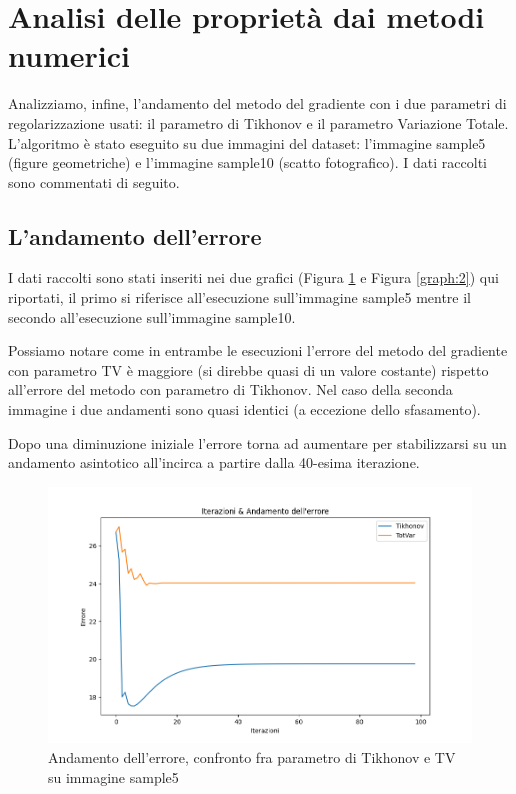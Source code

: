 \documentclass[12pt]{article}
\begin{document}
    \newpage

\section{Analisi delle proprietà dai metodi numerici}
    Analizziamo, infine, l'andamento del metodo del gradiente con i due parametri di regolarizzazione usati: il parametro di Tikhonov e il parametro Variazione Totale. L'algoritmo è stato eseguito su due immagini del dataset: l'immagine sample5 (figure geometriche) e l'immagine sample10 (scatto fotografico).
    I dati raccolti sono commentati di seguito.

    \subsection{L'andamento dell'errore}
    I dati raccolti sono stati inseriti nei due grafici (Figura \ref{graph:1} e Figura \ref{graph:2}) qui riportati, il primo si riferisce all'esecuzione sull'immagine sample5 mentre il secondo all'esecuzione sull'immagine sample10.

    Possiamo notare come in entrambe le esecuzioni l'errore del metodo del gradiente con parametro TV è maggiore (si direbbe quasi di un valore costante) rispetto all'errore del metodo con parametro di Tikhonov. Nel caso della seconda immagine i due andamenti sono quasi identici (a eccezione dello sfasamento).

    Dopo una diminuzione iniziale l'errore torna ad aumentare per stabilizzarsi su un andamento asintotico all'incirca a partire dalla 40-esima iterazione.

    \begin{figure}[h!]
    \centering
    \includegraphics[width=12cm]{errors-sample5}
    \caption{Andamento dell'errore, confronto fra parametro di Tikhonov e TV su immagine sample5}
    \label{graph:1}
    \end{figure}
\end{document}
